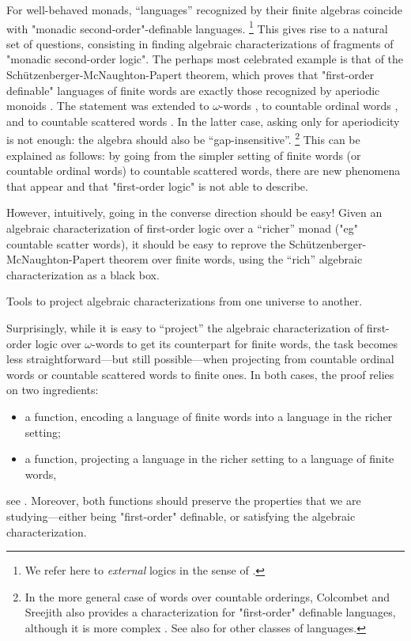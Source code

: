 For well-behaved monads, ``languages'' recognized by their finite algebras
coincide with "monadic second-order"-definable languages.%
\footnote{We refer here to \emph{external} logics in the sense of
.}
This gives rise to a natural set of questions, consisting
in finding algebraic characterizations
of fragments of "monadic second-order logic".
The perhaps most celebrated example is that of
the Schützenberger-McNaughton-Papert theorem,
which proves that "first-order definable" languages of finite words
are exactly those recognized by aperiodic monoids
\cite{Schutzenberger1965FiniteMonoidsAperiodic,McNaughtonPapert1971CounterFreeAutomata}.
The statement was extended to $\omega$-words \cite{Perrin1984Recent},
to countable ordinal words \cite{Bedon2001Logic},
and to countable scattered words \cite{BesCarton2011AlgebraicFO}.
In the latter case, asking only for aperiodicity is not enough:
the algebra should also be ``gap-insensitive''.%
\footnote{In the more general case of words over countable orderings,
Colcombet and Sreejith also provides a characterization for "first-order"
definable languages, although it is more complex \cite{ColcombetSreejith2015Limited}.
See also \cite{ColcombetSreejith2025RegularExpressionsCountableWords} for other
classes of languages.}
This can be explained as follows: by going from the simpler setting
of finite words (or countable ordinal words) to countable scattered words,
there are new phenomena that appear and that "first-order logic" is 
not able to describe.

However, intuitively, going in the converse direction should be easy!
Given an algebraic characterization of first-order logic over a ``richer'' monad
("eg" countable scatter words), it should be easy to reprove the
Schützenberger-McNaughton-Papert theorem over finite words, using the
``rich'' algebraic characterization as a black box.

\begin{marginfigure}
	\centering
	\begin{tikzpicture}
		
	\end{tikzpicture}
	\caption{
		\AP\label{fig:adjunction-informal}
		Tools to project algebraic characterizations from one universe to another.
	}
\end{marginfigure}
Surprisingly, while it is easy to ``project'' the algebraic characterization
of first-order logic over $\omega$-words to get its counterpart for finite words,
the task becomes less straightforward---but still possible---when projecting from
countable ordinal words or countable scattered words to finite ones.
In both cases, the proof relies on two ingredients:
\begin{itemize}
	\item a function, encoding a language of finite words into
		a language in the richer setting;
	\item a function, projecting a language in the richer setting
		to a language of finite words,
\end{itemize}
see .
Moreover, both functions should preserve the properties that we are studying---either
being "first-order" definable, or satisfying the algebraic characterization.

